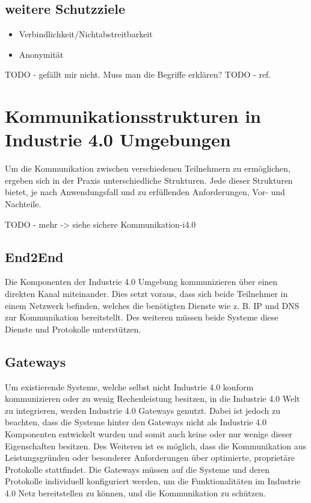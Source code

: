 \subsection{weitere Schutzziele}

\begin{itemize}
  \item Verbindlichkeit/Nichtabstreitbarkeit
  \item Anonymität
\end{itemize}

TODO - gefällt mir nicht. Muss man die Begriffe erklären?
TODO - ref. \cite{BMWiSec2016}

\section{Kommunikationsstrukturen in Industrie 4.0 Umgebungen}
Um die Kommunikation zwischen verschiedenen Teilnehmern zu ermöglichen, ergeben sich in der Praxis unterschiedliche Strukturen. Jede dieser Strukturen bietet, je nach Anwendungsfall und zu erfüllenden Anforderungen, Vor- und Nachteile.

TODO - mehr -> siehe sichere Kommunikation-i4.0

\subsection{End2End}
Die Komponenten der Industrie 4.0 Umgebung kommunizieren über einen direkten Kanal miteinander. Dies setzt voraus, dass sich beide Teilnehmer in einem Netzwerk befinden, welches die benötigten Dienste wie z. B. \ac{IP} und \ac{DNS} zur Kommunikation bereitstellt. Des weiteren müssen beide Systeme diese Dienste und Protokolle unterstützen.

\subsection{Gateways}
Um existierende Systeme, welche selbst nicht Industrie 4.0 konform kommunizieren oder zu wenig Rechenleistung besitzen, in die Industrie 4.0 Welt zu integrieren, werden Industrie 4.0 Gateways genutzt. Dabei ist jedoch zu beachten, dass die Systeme hinter den Gateways nicht als Industrie 4.0 Komponenten entwickelt wurden und somit auch keine oder nur wenige dieser Eigenschaften besitzen. Des Weiteren ist es möglich, dass die Kommunikation aus Leistungsgründen oder besonderer Anforderungen über optimierte, proprietäre Protokolle stattfindet. Die Gateways müssen auf die Systeme und deren Protokolle individuell konfiguriert werden, um die Funktionalitäten im Industrie 4.0 Netz bereitstellen zu können, und die Kommunikation zu schützen.

